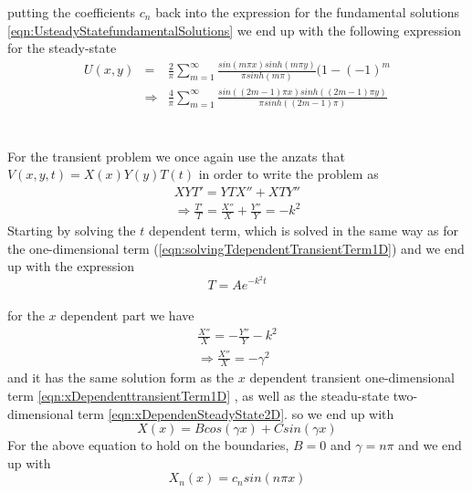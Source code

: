 \documentclass{article}
\begin{document}
putting the coefficients $c_n$ back into the expression for the fundamental solutions \ref{eqn:UsteadyStatefundamentalSolutions} we end up with the following expression for the steady-state
\begin{subequations}
\begin{eqnarray}
U(x,y) &=& \frac{2}{\pi} \sum_{m=1}^{\infty} \frac{sin(m\pi x)sinh(m\pi y)}{\pi sinh(m\pi)}(1-(-1)^m \\ 
&\Rightarrow & \frac{4}{\pi} \sum_{m=1}^{\infty} \frac{sin((2m-1)\pi x)sinh((2m-1)\pi y)}{\pi sinh((2m-1)\pi)}
\end{eqnarray}
\end{subequations}
\\
\\
For the transient problem we once again use the anzats that $V(x,y,t) = X(x)Y(y)T(t)$ in order to write the problem as
\begin{subequations}
\begin{eqnarray}
XYT' = YTX'' + XTY'' \\
\Rightarrow \frac{T'}{T} = \frac{X''}{X} + \frac{Y''}{Y} = -k^2
\end{eqnarray}
\end{subequations}
Starting by solving the $t$ dependent term, which is solved in the same way as for the one-dimensional term (\ref{eqn:solvingTdependentTransientTerm1D}) and we end up with the expression
\begin{equation}
T=Ae^{-k^2t}
\label{eqn:2DtransientTdependentGeneralTerm}
\end{equation}
\\
for the $x$ dependent part we have 
\begin{subequations}
\begin{eqnarray}
\frac{X''}{X} = -\frac{Y''}{Y} - k^2\\
\Rightarrow \frac{X''}{X} = -\gamma^2
\end{eqnarray}
\end{subequations}
and it has the same solution form as the $x$ dependent transient one-dimensional term \ref{eqn:xDependenttransientTerm1D} , as well as the steadu-state two-dimensional term \ref{eqn:xDependenSteadyState2D}. so we end up with 
\begin{equation}
X(x) = Bcos(\gamma x) + Csin(\gamma x)
\end{equation}
For the above equation to hold on the boundaries, $B=0$ and $\gamma = n\pi$ and we end up with
\begin{equation}
X_n(x) = c_nsin(n\pi x)
\label{eqn:2DtransientXdependentTerm}
\end{equation}
\end{document}
